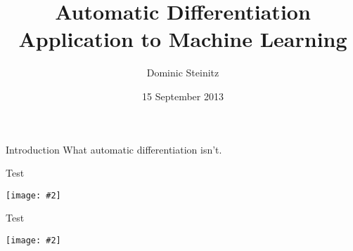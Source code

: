 \documentclass{beamer}
\title[Automatic differentiation and neural nets]{Automatic
  Differentiation\\Application to Machine Learning}
\author{Dominic Steinitz}
\institute{Kingston University}
\date{15 September 2013}
\newcommand {\framedgraphic}[2] {
    \begin{frame}{#1}
        \begin{center}
            \texttt{[image: \#2]}
        \end{center}
    \end{frame}
}
\begin{document}
\begin{frame}
\titlepage
\end{frame}


\begin{frame}{Introduction}
What automatic differentiation isn't.
\end{frame}

\framedgraphic{Test}{diagrams/47765b66dd184563734f30899fe8fe0e.png}

\framedgraphic{Test}{diagrams/2f3e3aed228a56c0d0d9ca086f05e1d5.png}
\end{document}
